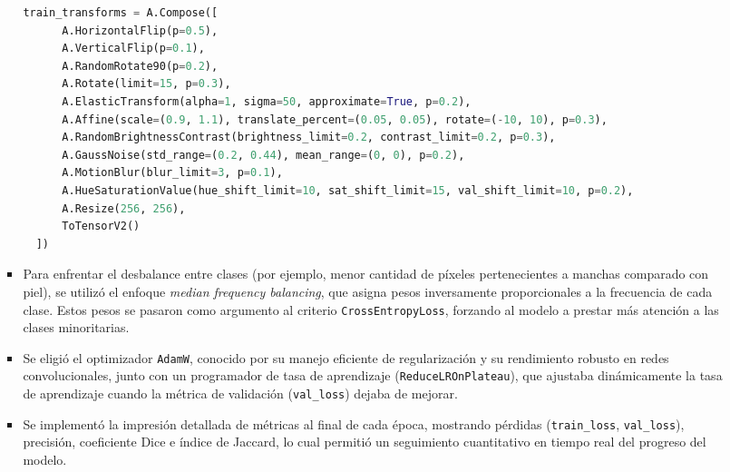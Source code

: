 \begin{enumerate}
\begin{itemize}
\begin{itemize}
\begin{lstlisting}[language=Python]
  train_transforms = A.Compose([
      A.HorizontalFlip(p=0.5),
      A.VerticalFlip(p=0.1),
      A.RandomRotate90(p=0.2),
      A.Rotate(limit=15, p=0.3),
      A.ElasticTransform(alpha=1, sigma=50, approximate=True, p=0.2),
      A.Affine(scale=(0.9, 1.1), translate_percent=(0.05, 0.05), rotate=(-10, 10), p=0.3),
      A.RandomBrightnessContrast(brightness_limit=0.2, contrast_limit=0.2, p=0.3),
      A.GaussNoise(std_range=(0.2, 0.44), mean_range=(0, 0), p=0.2),
      A.MotionBlur(blur_limit=3, p=0.1),
      A.HueSaturationValue(hue_shift_limit=10, sat_shift_limit=15, val_shift_limit=10, p=0.2),
      A.Resize(256, 256),
      ToTensorV2()
  ])
  \end{lstlisting}

\item Para enfrentar el desbalance entre clases (por ejemplo, menor cantidad de píxeles pertenecientes a manchas comparado con piel), se utilizó el enfoque \emph{median frequency balancing}, que asigna pesos inversamente proporcionales a la frecuencia de cada clase. Estos pesos se pasaron como argumento al criterio \texttt{CrossEntropyLoss}, forzando al modelo a prestar más atención a las clases minoritarias.

\item Se eligió el optimizador \texttt{AdamW}, conocido por su manejo eficiente de regularización y su rendimiento robusto en redes convolucionales, junto con un programador de tasa de aprendizaje (\texttt{ReduceLROnPlateau}), que ajustaba dinámicamente la tasa de aprendizaje cuando la métrica de validación (\texttt{val\_loss}) dejaba de mejorar.

\item Se implementó la impresión detallada de métricas al final de cada época, mostrando pérdidas (\texttt{train\_loss}, \texttt{val\_loss}), precisión, coeficiente Dice e índice de Jaccard, lo cual permitió un seguimiento cuantitativo en tiempo real del progreso del modelo.
\end{itemize}



\end{itemize}
\end{enumerate}
